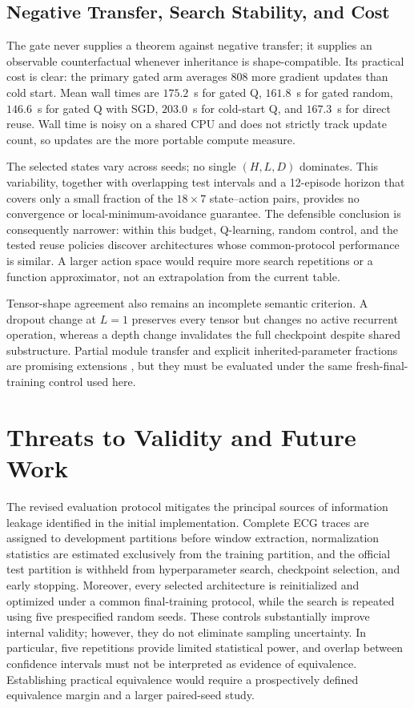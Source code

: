 \documentclass[conference]{IEEEtran}
\begin{document}
\subsection{Negative Transfer, Search Stability, and Cost}
The gate never supplies a theorem against negative transfer; it supplies an observable counterfactual whenever inheritance is shape-compatible. Its practical cost is clear: the primary gated arm averages 808 more gradient updates than cold start. Mean wall times are $175.2$~s for gated Q, $161.8$~s for gated random, $146.6$~s for gated Q with SGD, $203.0$~s for cold-start Q, and $167.3$~s for direct reuse. Wall time is noisy on a shared CPU and does not strictly track update count, so updates are the more portable compute measure.

The selected states vary across seeds; no single $(H,L,D)$ dominates. This variability, together with overlapping test intervals and a 12-episode horizon that covers only a small fraction of the $18\times7$ state--action pairs, provides no convergence or local-minimum-avoidance guarantee. The defensible conclusion is consequently narrower: within this budget, Q-learning, random control, and the tested reuse policies discover architectures whose common-protocol performance is similar. A larger action space would require more search repetitions or a function approximator, not an extrapolation from the current table.

Tensor-shape agreement also remains an incomplete semantic criterion. A dropout change at $L=1$ preserves every tensor but changes no active recurrent operation, whereas a depth change invalidates the full checkpoint despite shared substructure. Partial module transfer and explicit inherited-parameter fractions are promising extensions \cite{cai2018efficient}, but they must be evaluated under the same fresh-final-training control used here.

\section{Threats to Validity and Future Work}
The revised evaluation protocol mitigates the principal sources of information leakage identified in the initial implementation. Complete ECG traces are assigned to development partitions before window extraction, normalization statistics are estimated exclusively from the training partition, and the official test partition is withheld from hyperparameter search, checkpoint selection, and early stopping. Moreover, every selected architecture is reinitialized and optimized under a common final-training protocol, while the search is repeated using five prespecified random seeds. These controls substantially improve internal validity; however, they do not eliminate sampling uncertainty. In particular, five repetitions provide limited statistical power, and overlap between confidence intervals must not be interpreted as evidence of equivalence. Establishing practical equivalence would require a prospectively defined equivalence margin and a larger paired-seed study.
\end{document}
